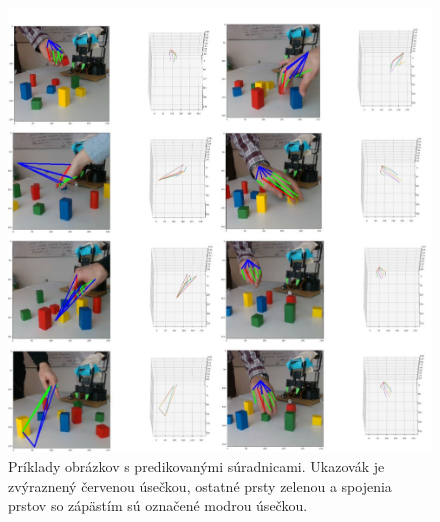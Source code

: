 \begin{figure}[H]
	\begin{center}
		\includegraphics[width=\textwidth]{images/predicted_hands.jpg}
		\caption{Príklady obrázkov s predikovanými súradnicami. Ukazovák je zvýraznený červenou úsečkou, ostatné prsty zelenou a spojenia prstov so zápästím sú označené modrou úsečkou.}
		\label{img:predicted_hands}
	\end{center}
\end{figure}